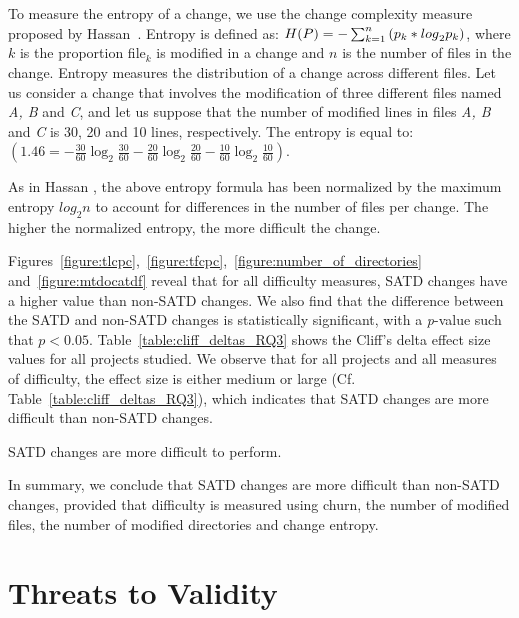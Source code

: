 To measure the entropy of a change, we use the change complexity measure proposed by Hassan~\cite{hassan2009predicting}. Entropy is defined as: $H(P)=-\sum _{k=1}^{n}\textrm ({p}_{k}*{log}_{2} {p}_{k})$, where $k$ is the proportion file$_{k}$ is modified in a change and $n$ is the number of files in the change. Entropy measures the distribution of a change across different files. Let us consider a change that involves the modification of three different files named \textit{A, B} and \textit{C}, and let us suppose that the number of modified lines in files\textit{ A, B} and \textit{C} is 30, 20 and 10 lines, respectively. The entropy is equal to:
$(1.46=-\frac{30}{60}\log_{2}\frac{30}{60}-\frac{20}{60}\log_{2}\frac{20}{60}-\frac{10}{60}\log_{2}\frac{10}{60})$.

As in Hassan \cite{hassan2009predicting}, the above entropy formula has been normalized by the maximum entropy $log_{2}n$ to account for differences in the number of files per change. The higher the normalized entropy, the more difficult the change.




 Figures~\ref{figure:tlcpc},~\ref{figure:tfcpc},~\ref{figure:number_of_directories} and~\ref{figure:mtdocatdf} reveal that for all difficulty measures, SATD changes have a higher value than non-SATD changes. We also find that the difference between the SATD and non-SATD changes is statistically significant, with a \textit{p}-value such that $p < 0.05$. Table~\ref{table:cliff_deltas_RQ3} shows the Cliff's delta effect size values for all projects studied. We observe that for all projects and all measures of difficulty, the effect size is either medium or large (Cf. Table~\ref{table:cliff_deltas_RQ3}), which indicates that SATD changes are more difficult than non-SATD changes.

\begin{myboxii}
	SATD changes are more difficult to perform.
\end{myboxii}


In summary, we conclude that SATD changes are more difficult than non-SATD changes, provided that difficulty is measured using churn, the number of modified files, the number of modified directories and change entropy.







\section{Threats to Validity}
\label{chap3:sec:threats_to_validity}

